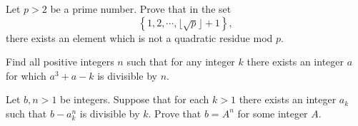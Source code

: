 \documentclass{subfile}
\begin{document}
	\begin{problem} %
		Let $p>2$ be a prime number. Prove that in the set $$\left\{1,2, \cdots ,\lfloor{\sqrt{p}}\rfloor+1\right\},$$ there exists an element which is not a quadratic residue mod $p$.
	\end{problem}
	
	
	\begin{problem}[APMO 2014] %
		Find all positive integers $n$ such that for any integer $k$ there exists an integer $a$ for which $a^3+a-k$ is divisible by $n$.
	\end{problem}
	
	\begin{problem}
		Let $b,n > 1$ be integers. Suppose that for each $k > 1$ there exists an integer $a_k$ such that $b - a^n_k$ is divisible by $k$. Prove that $b = A^n$ for some integer $A$.
	\end{problem}
	
	
\end{document}
